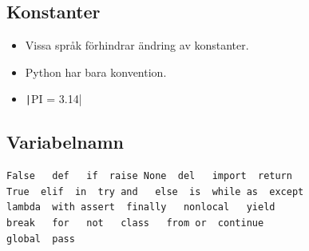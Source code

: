 \subsection{Konstanter}

\begin{frame}
  \begin{remark}
    \begin{itemize}
      \item Vissa språk förhindrar ändring av konstanter.
      \item Python har bara konvention.
      \item \texttt|PI = 3.14|
    \end{itemize}
  \end{remark}
\end{frame}


\subsection{Variabelnamn}

\begin{frame}[fragile]
  \begin{remark}
    \begin{verbatim}
False   def   if  raise None  del   import  return
True  elif  in  try and   else  is  while as  except
lambda  with assert  finally   nonlocal   yield
break   for   not   class   from or  continue
global  pass
    \end{verbatim}
  \end{remark}
\end{frame}
